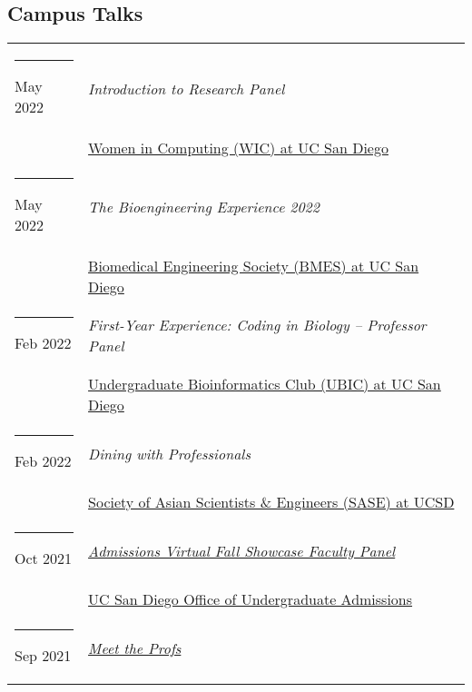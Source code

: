 \documentclass[margin,line]{res}
\begin{document}
\begin{resume}
\newpage
\section{\sc Campus Talks}
\begin{longtable}{@{}p{0.7in}p{4in}}\rule{-1mm}{4.5mm}
\hspace*{-4mm} May 2022 & \textit{Introduction to Research Panel}\\*
\hspace*{-4mm} & \hspace{4mm} \href{http://wic.ucsd.edu/}{Women in Computing (WIC) at UC San Diego}\\
\hspace*{-4mm} \rule{-1mm}{5mm} May 2022 & \textit{The Bioengineering Experience 2022}\\*
\hspace*{-4mm} & \hspace{4mm} \href{http://bmes.ucsd.edu/}{Biomedical Engineering Society (BMES) at UC San Diego}\\
\hspace*{-4mm} \rule{-1mm}{5mm} Feb 2022 & \textit{First-Year Experience: Coding in Biology -- Professor Panel}\\*
\hspace*{-4mm} & \hspace{4mm} \href{https://ubicucsd.github.io/}{Undergraduate Bioinformatics Club (UBIC) at UC San Diego}\\
\hspace*{-4mm} \rule{-1mm}{5mm} Feb 2022 & \textit{Dining with Professionals}\\*
\hspace*{-4mm} & \hspace{4mm} \href{https://saseatucsd.weebly.com/}{Society of Asian Scientists \& Engineers (SASE) at UCSD}\\
\hspace*{-4mm} \rule{-1mm}{5mm} Oct 2021 & \href{https://beatriton.ucsd.edu/register/ucsdvirtualfallshowcase}{\textit{Admissions Virtual Fall Showcase Faculty Panel}}\\*
\hspace*{-4mm} & \hspace{4mm} \href{https://admissions.ucsd.edu/}{UC San Diego Office of Undergraduate Admissions}\\
\hspace*{-4mm} \rule{-1mm}{5mm} Sep 2021 & \href{https://www.facebook.com/events/610194613335437}{\textit{Meet the Profs}}\\*

\end{longtable}
\end{resume}
\end{document}
